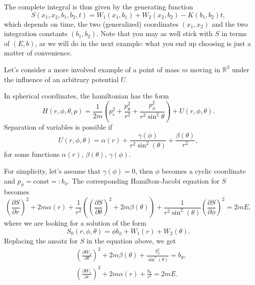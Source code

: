 \documentclass[english,fontsize=11pt,paper=a5,oneside]{scrbook}
\newcommand{\R}{\mathbb{R}}
\theoremstyle{definition}
\newenvironment{example}
  {\pushQED{\qed}\renewcommand{\qedsymbol}{$\lozenge$}\examplex}
  {\popQED\endexamplex}
\begin{document}
\begin{example}[Planar harmonic oscillator]
  The complete integral is thus given by the generating function
  \begin{equation}
    S(x_1,x_2,b_1,b_2,t) = W_1(x_1, b_1) + W_2(x_2,b_2) - K(b_1, b_2) t,
  \end{equation}
  which depends on time, the two (generalized) coordinates $(x_1, x_2)$ and the two integration constants $(b_1, b_2)$.
  Note that you may as well stick with $S$ in terms of $(E, b)$, as we will do in the next example: what you end up choosing is just a matter of convenience.
\end{example}

\begin{example}\label{ex:kepler3dseparable}
  Let's consider a more involved example of a point of mass $m$ moving in $\R^3$ under the influence of an arbitrary potential $U$.

  In spherical coordinates, the hamiltonian has the form
  \begin{equation}
    H(r,\phi,\theta, p) = \frac{1}{2m}\left(p_r^2 + \frac{p_\theta^2}{r^2} + \frac{p_\phi^2}{r^2\sin^2\theta}\right)
    + U(r,\phi,\theta).
  \end{equation}
  Separation of variables is possible if
  \begin{equation}
    U(r,\phi,\theta) = \alpha(r) + \frac{\gamma(\phi)}{r^2 \sin^2(\theta)} + \frac{\beta(\theta)}{r^2},
  \end{equation}
  for some functions $\alpha(r)$, $\beta(\theta)$, $\gamma(\phi)$.

  For simplicity, let's assume that $\gamma(\phi) = 0$, then $\phi$ becomes a cyclic coordinate and $p_\phi = \mathrm{const} =: b_\phi$.
  The corresponding Hamilton-Jacobi equation for $S$ becomes
  \begin{equation}
    \left(\frac{\partial S}{\partial r}\right)^2 + 2m\alpha(r)
    + \frac{1}{r^2}\left(
    \left(\frac{\partial S}{\partial \theta}\right)^2 + 2m\beta(\theta)
    \right)
    + \frac{1}{r^2\sin^2(\theta)}\left(\frac{\partial S}{\partial \phi}\right)^2 = 2mE,
  \end{equation}
  where we are looking for a solution of the form
  \begin{equation}
    S_0(r,\phi,\theta) = \phi b_\phi + W_1(r) + W_2(\theta).
  \end{equation}
  Replacing the ansatz for $S$ in the equation above, we get
  \begin{align}
     & \left(\frac{\partial W_2}{\partial \theta}\right)^2 + 2m \beta(\theta) + \frac{b_\phi^2}{\sin^2(\theta)} = b_\theta, \\
     & \left(\frac{\partial W_1}{\partial r}\right)^2 + 2m \alpha(r) + \frac{b_\theta}{r^2} = 2mE.
  \end{align}


\end{example}
\end{document}
